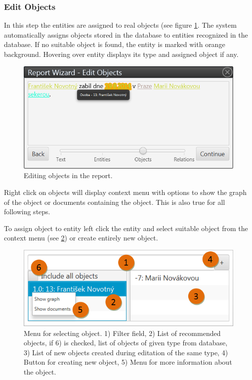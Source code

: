 \documentclass[12pt,a4paper]{report}
\begin{document}
\subsubsection{Edit Objects}
\label{sssec:EditObjects}

In this step the entities are assigned to real objects (see figure
\ref{fig:Objects}. The system automatically assigns objects stored in the
database to entities recognized in the database. If no suitable object is
found, the entity is marked with orange background. Hovering over entity
displays its type and assigned object if any.

\begin{figure}[!htb]
        \centering
        \includegraphics[width=\textwidth]{Images/objects}
        \caption{Editing objects in the report.}
        \label{fig:Objects}
\end{figure}

Right click on objects will display context menu with options to show the graph
of the object or documents containing the object. This is also true for all following steps.

To assign object to entity left click the entity and select suitable object
from the context menu (see \ref{fig:ObjectMenu}) or create entirely new object.

\begin{figure}[!htb]
        \centering
        \includegraphics[width=\textwidth]{Images/objectmenu}
        \caption{Menu for selecting object. 1) Filter field, 2) List of recommended objects, if 6) is checked, list of objects of given type from database, 3) List of new objects created during editation of the same type, 4) Button for creating new object, 5) Menu for more information about the object.}
        \label{fig:ObjectMenu}
\end{figure}
\end{document}
